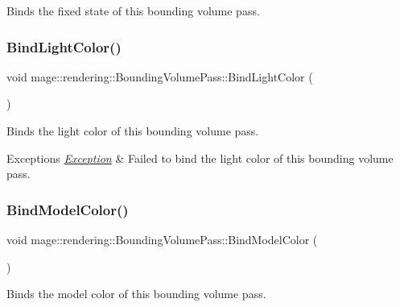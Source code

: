 Binds the fixed state of this bounding volume pass. \hypertarget{classmage_1_1rendering_1_1_bounding_volume_pass_a0bf1d814b3ebb56a6076bfb1cb27de8d}{}\label{classmage_1_1rendering_1_1_bounding_volume_pass_a0bf1d814b3ebb56a6076bfb1cb27de8d} 
\subsubsection{\texorpdfstring{Bind\+Light\+Color()}{BindLightColor()}}
{\footnotesize\ttfamily void mage\+::rendering\+::\+Bounding\+Volume\+Pass\+::\+Bind\+Light\+Color (\begin{DoxyParamCaption}{ }\end{DoxyParamCaption})\hspace{0.3cm}{\ttfamily [private]}}

Binds the light color of this bounding volume pass.


\begin{DoxyExceptions}{Exceptions}
{\em \hyperlink{classmage_1_1_exception}{Exception}} & Failed to bind the light color of this bounding volume pass. \\
\hline
\end{DoxyExceptions}
\hypertarget{classmage_1_1rendering_1_1_bounding_volume_pass_a5b889af6dc3c58aecdd619dee69feca0}{}\label{classmage_1_1rendering_1_1_bounding_volume_pass_a5b889af6dc3c58aecdd619dee69feca0} 
\subsubsection{\texorpdfstring{Bind\+Model\+Color()}{BindModelColor()}}
{\footnotesize\ttfamily void mage\+::rendering\+::\+Bounding\+Volume\+Pass\+::\+Bind\+Model\+Color (\begin{DoxyParamCaption}{ }\end{DoxyParamCaption})\hspace{0.3cm}{\ttfamily [private]}}

Binds the model color of this bounding volume pass.


